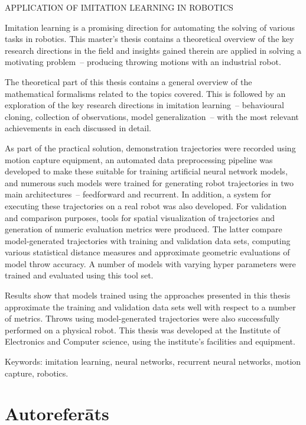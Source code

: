 \documentclass[12pt, a4paper]{article}
\numberwithin{equation}{section} %
\begin{document}
\begin{center}
    APPLICATION OF IMITATION LEARNING IN ROBOTICS
\end{center}

Imitation learning is a promising direction for automating the solving of various tasks in robotics. This master's thesis contains a theoretical overview of the key research directions in the field and insights gained therein are applied in solving a motivating problem~-- producing throwing motions with an industrial robot.

The theoretical part of this thesis contains a general overview of the mathematical formalisms related to the topics covered. This is followed by an exploration of the key research directions in imitation learning~-- behavioural cloning, collection of observations, model generalization~-- with the most relevant achievements in each discussed in detail.

As part of the practical solution, demonstration trajectories were recorded using motion capture equipment, an automated data preprocessing pipeline was developed to make these suitable for training artificial neural network models, and numerous such models were trained for generating robot trajectories in two main architectures~-- feedforward and recurrent. In addition, a system for executing these trajectories on a real robot was also developed. For validation and comparison purposes, tools for spatial visualization of trajectories and generation of numeric evaluation metrics were produced. The latter compare model-generated trajectories with training and validation data sets, computing various statistical distance measures and approximate geometric evaluations of model throw accuracy. A number of models with varying hyper parameters were trained and evaluated using this tool set.

Results show that models trained using the approaches presented in this thesis approximate the training and validation data sets well with respect to a number of metrics. Throws using model-generated trajectories were also successfully performed on a physical robot. This thesis was developed at the Institute of Electronics and Computer science, using the institute's facilities and equipment.\bigbreak

Keywords: imitation learning, neural networks, recurrent neural networks, motion capture, robotics.

\newpage
{}
\section*{Autoreferāts}
\thispagestyle{empty}
\end{document}
